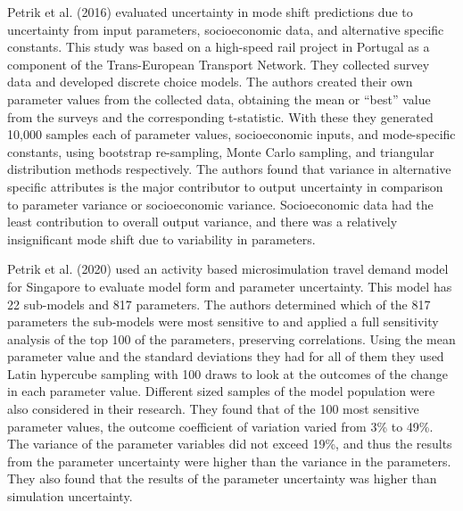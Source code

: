 \documentclass[
  futuretransp,
  submit,
  moreauthors,
]{Definitions/mdpi}
\begin{document}
Petrik et al. (2016) evaluated uncertainty in mode shift predictions due
to uncertainty from input parameters, socioeconomic data, and
alternative specific constants. This study was based on a high-speed
rail project in Portugal as a component of the Trans-European Transport
Network. They collected survey data and developed discrete choice
models. The authors created their own parameter values from the
collected data, obtaining the mean or ``best'' value from the surveys
and the corresponding t-statistic. With these they generated 10,000
samples each of parameter values, socioeconomic inputs, and
mode-specific constants, using bootstrap re-sampling, Monte Carlo
sampling, and triangular distribution methods respectively. The authors
found that variance in alternative specific attributes is the major
contributor to output uncertainty in comparison to parameter variance or
socioeconomic variance. Socioeconomic data had the least contribution to
overall output variance, and there was a relatively insignificant mode
shift due to variability in parameters.

Petrik et al. (2020) used an activity based microsimulation travel
demand model for Singapore to evaluate model form and parameter
uncertainty. This model has 22 sub-models and 817 parameters. The
authors determined which of the 817 parameters the sub-models were most
sensitive to and applied a full sensitivity analysis of the top 100 of
the parameters, preserving correlations. Using the mean parameter value
and the standard deviations they had for all of them they used Latin
hypercube sampling with 100 draws to look at the outcomes of the change
in each parameter value. Different sized samples of the model population
were also considered in their research. They found that of the 100 most
sensitive parameter values, the outcome coefficient of variation varied
from 3\% to 49\%. The variance of the parameter variables did not exceed
19\%, and thus the results from the parameter uncertainty were higher
than the variance in the parameters. They also found that the results of
the parameter uncertainty was higher than simulation uncertainty.
\end{document}
